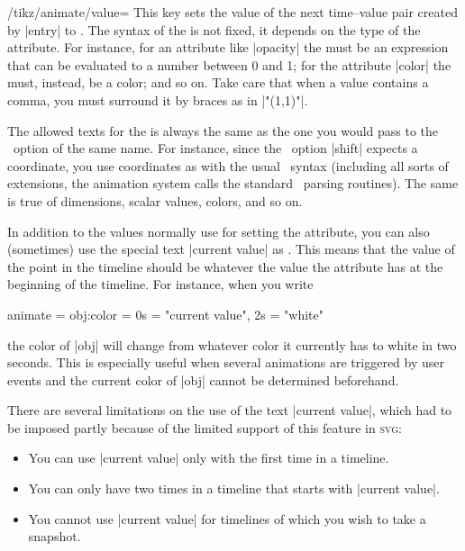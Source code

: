 \begin{key}{/tikz/animate/value=}
  This key sets the value of the next time--value pair created by
  |entry| to . The syntax of the  is not
  fixed, it depends on the type of 
  the attribute. For instance, for an attribute like |opacity| the
   must be an expression that can be evaluated to a number
  between 0 and 1; for the attribute |color| the  must,
  instead, be a color; and so on.  Take care that when a value
  contains a comma, you must surround it by braces as in |"{(1,1)}"|.  

  The allowed texts for the  is always the same as the
  one you would pass to the \tikzname\ option of the same 
  name. For instance, since the \tikzname\ option |shift| expects a
  coordinate, you use coordinates as  with the usual
  \tikzname\ syntax (including all sorts of extensions, the animation
  system calls the standard \tikzname\ parsing routines). The same is
  true of dimensions, scalar values, colors, and so on.

  In addition to the values normally use for setting the attribute,
  you can also (sometimes) use the special text |current value| as
  . This means that the value of the point in the timeline
  should be whatever the value the attribute has at the beginning of
  the timeline. For instance, when you write
\begin{codeexample}
animate = { obj:color = { 0s = "current value", 2s = "white" } }     
\end{codeexample}
  the color of |obj| will change from whatever color it currently has
  to white in two seconds. This is especially useful when several
  animations are triggered by user events and the current color of
  |obj| cannot be determined beforehand.

  There are several limitations on the use of the text
  |current value|, which had to be imposed partly because of the limited
  support of this feature in \textsc{svg}:
  \begin{itemize}
  \item You can use |current value| only with the first time in a
    timeline.
  \item You can only have two times in a timeline that starts with
    |current value|.
  \item You cannot use |current value| for timelines of which you wish
    to take a snapshot.
  \end{itemize}
\end{key}



